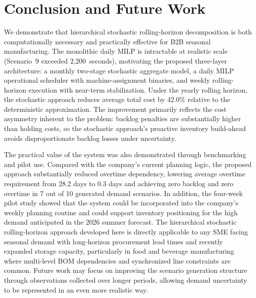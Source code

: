 \documentclass[11pt]{article}
\begin{document}
\section{Conclusion and Future Work}

We demonstrate that hierarchical stochastic rolling-horizon decomposition is both computationally necessary and practically effective for B2B seasonal manufacturing. The monolithic daily MILP is intractable at realistic scale (Scenario~9 exceeded 2,200~seconds), motivating the proposed three-layer architecture: a monthly two-stage stochastic aggregate model, a daily MILP operational scheduler with machine-assignment binaries, and weekly rolling-horizon execution with near-term stabilization. Under the yearly rolling horizon, the stochastic approach reduces average total cost by 42.0\% relative to the deterministic approximation. The improvement primarily reflects the cost asymmetry inherent to the problem: backlog penalties are substantially higher than holding costs, so the stochastic approach’s proactive inventory build-ahead avoids disproportionate backlog losses under uncertainty.

The practical value of the system was also demonstrated through benchmarking and pilot use. Compared with the company’s current planning logic, the proposed approach substantially reduced overtime dependency, lowering average overtime requirement from 28.2 days to 0.3 days and achieving zero backlog and zero overtime in 7 out of 10 generated demand scenarios. In addition, the four-week pilot study showed that the system could be incorporated into the company’s weekly planning routine and could support inventory positioning for the high demand anticipated in the 2026 summer forecast. The hierarchical stochastic rolling-horizon approach developed here is directly applicable to any SME facing seasonal demand with long-horizon procurement lead times and recently expanded storage capacity, particularly in food and beverage manufacturing where multi-level BOM dependencies and synchronized line constraints are common. Future work may focus on improving the scenario generation structure through observations collected over longer periods, allowing demand uncertainty to be represented in an even more realistic way.



\end{document}

